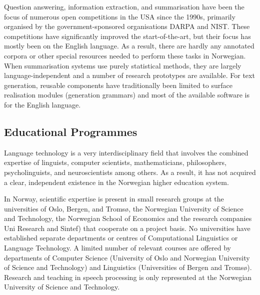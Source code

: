 \begin{multicols}{2}
Question answering, information extraction, and summarisation have been the focus of numerous open competitions in the USA since the 1990s, primarily organised by the government-sponsored organisations DARPA and NIST. 
These competitions have significantly improved the start-of-the-art, but their focus has mostly been on the English language. 
As a result, there are hardly any annotated corpora or other special resources needed to perform these tasks in Norwegian. 
When summarisation systems use purely statistical methods, they are largely language-independent and a number of research prototypes are available. 
For text generation, reusable components have traditionally been limited to surface realisation modules (generation grammars) and most of the available software is for the English language.

\subsection{Educational Programmes}

Language technology is a very interdisciplinary field that involves the combined expertise of linguists, computer scientists, mathematicians, philosophers, psycholinguists, and neuroscientists among others. 
As a result, it has not acquired a clear, independent existence in the Norwegian higher education system. 

In Norway, scientific expertise is present in small research groups at the universities of Oslo, Bergen, and Tromsø, the Norwegian University of Science and Technology, the Norwegian School of Economics and the research companies Uni Research and Sintef) that cooperate on a project basis. 
No universities have established separate departments or centres of Computational Linguistics or Language Technology. 
A limited number of relevant courses are offered by departments of Computer Science (University of Oslo and Norwegian University of Science and Technology) and Linguistics (Universities of Bergen and Tromsø). 
Research and teaching in speech processing is only represented at the Norwegian University of Science and Technology. 



\end{multicols}
